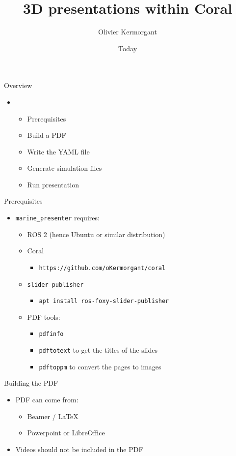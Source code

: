 \documentclass{ecnbeamer}
\title{3D presentations within Coral}
\author{Olivier Kermorgant}
\date{Today}
\begin{document}
\MakeTitleNoFoot
\FootPage

\begin{frame}{Overview}
 
\begin{itemize}
\item ~ \vfill
\begin{itemize}
 \item Prerequisites\vfill
 \item Build a PDF\vfill
 \item Write the YAML file\vfill
 \item Generate simulation files \vfill
 \item Run presentation
\end{itemize}
\end{itemize}
\end{frame}

\begin{frame}{Prerequisites}
\begin{itemize}[<+->]
 \item \texttt{marine\_presenter} requires:\vfill
 \begin{itemize}
  \item ROS 2 (hence Ubuntu or similar distribution)\vfill
  \item Coral
  \begin{itemize}
   \item \texttt{https://github.com/oKermorgant/coral}
  \end{itemize}\vfill
    \item \texttt{slider\_publisher}
  \begin{itemize}
   \item \texttt{apt install ros-foxy-slider-publisher}
  \end{itemize}\vfill
  \item PDF tools:
  \begin{itemize}
   \item \texttt{pdfinfo}
   \item \texttt{pdftotext} to get the titles of the slides
   \item \texttt{pdftoppm} to convert the pages to images
  \end{itemize}
 \end{itemize}
\end{itemize} 
\end{frame}


\begin{frame}{Building the PDF}
\begin{itemize}
 \item PDF can come from:
 \begin{itemize}
  \item Beamer / LaTeX\vfill
  \item Powerpoint or LibreOffice
 \end{itemize}\vfill
 \item Videos should not be included in the PDF\vfill
\end{itemize} 
\end{frame}
\end{document}
